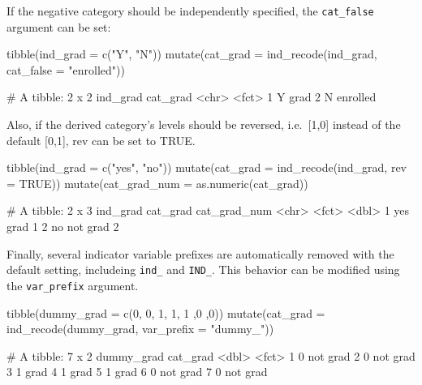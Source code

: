 If the negative category should be independently specified, the
\texttt{cat\_false} argument can be set:

\begin{Schunk}
\begin{Sinput}
tibble(ind_grad = c("Y", "N")) %
  mutate(cat_grad  = ind_recode(ind_grad, cat_false = "enrolled"))
\end{Sinput}
\begin{Soutput}
     # A tibble: 2 x 2
       ind_grad cat_grad
       <chr>    <fct>   
     1 Y        grad    
     2 N        enrolled
\end{Soutput}
\end{Schunk}

Also, if the derived category's levels should be reversed,
i.e.~{[}1,0{]} instead of the default {[}0,1{]}, rev can be set to TRUE.

\begin{Schunk}
\begin{Sinput}
tibble(ind_grad = c("yes", "no")) %
  mutate(cat_grad  = ind_recode(ind_grad, rev = TRUE)) %
  mutate(cat_grad_num = as.numeric(cat_grad))
\end{Sinput}
\begin{Soutput}
     # A tibble: 2 x 3
       ind_grad cat_grad cat_grad_num
       <chr>    <fct>           <dbl>
     1 yes      grad                1
     2 no       not grad            2
\end{Soutput}
\end{Schunk}

Finally, several indicator variable prefixes are automatically removed
with the default setting, includeing \texttt{ind\_} and \texttt{IND\_}.
This behavior can be modified using the \texttt{var\_prefix} argument.

\begin{Schunk}
\begin{Sinput}
tibble(dummy_grad = c(0, 0, 1, 1, 1 ,0 ,0)) %
  mutate(cat_grad  = ind_recode(dummy_grad, 
                                var_prefix = "dummy_"))
\end{Sinput}
\begin{Soutput}
     # A tibble: 7 x 2
       dummy_grad cat_grad
            <dbl> <fct>   
     1          0 not grad
     2          0 not grad
     3          1 grad    
     4          1 grad    
     5          1 grad    
     6          0 not grad
     7          0 not grad
\end{Soutput}
\end{Schunk}

